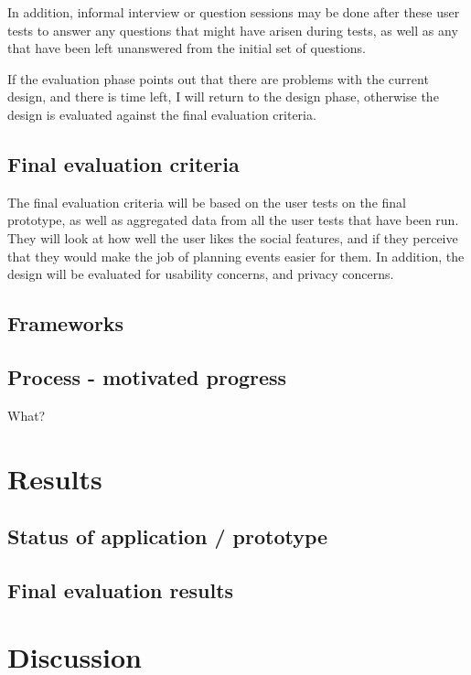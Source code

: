 \documentclass[]{report}
\begin{document}
In addition, informal interview or question sessions may be done after these
user tests to answer any questions that might have arisen during tests, as well
as any that have been left unanswered from the initial set of questions.

If the evaluation phase points out that there are problems with the current
design, and there is time left, I will return to the design phase, otherwise the
design is evaluated against the final evaluation criteria.

\section{Final evaluation criteria}

The final evaluation criteria will be based on the user tests on the final
prototype, as well as aggregated data from all the user tests that have been
run. They will look at how well the user likes the social features, and if they
perceive that they would make the job of planning events easier for them. In
addition, the design will be evaluated for usability concerns, and privacy
concerns.

\section{Frameworks}

\section{Process - motivated progress}

What?

\chapter{Results}

\section{Status of application / prototype}

\section{Final evaluation results}

\chapter{Discussion}
\end{document}
